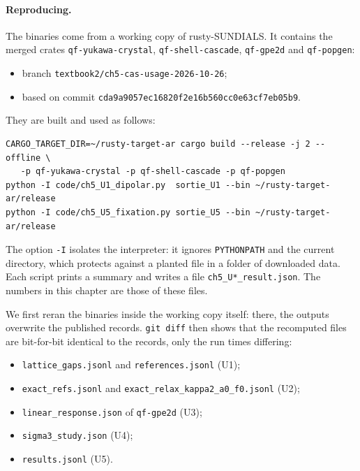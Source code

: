 \paragraph{Reproducing.} The binaries come from a working copy of rusty-SUNDIALS. It contains the merged crates
\texttt{qf-yukawa-crystal}, \texttt{qf-shell-cascade}, \texttt{qf-gpe2d} and \texttt{qf-popgen}:
\begin{itemize}
\item branch \texttt{textbook2/ch5-cas-usage-2026-10-26};
\item based on commit \texttt{cda9a9057ec16820f2e16b560cc0e63cf7eb05b9}.
\end{itemize}
They are built and used as follows:
\begin{lstlisting}[language={}]
CARGO_TARGET_DIR=~/rusty-target-ar cargo build --release -j 2 --offline \
   -p qf-yukawa-crystal -p qf-shell-cascade -p qf-popgen
python -I code/ch5_U1_dipolar.py  sortie_U1 --bin ~/rusty-target-ar/release
python -I code/ch5_U5_fixation.py sortie_U5 --bin ~/rusty-target-ar/release
\end{lstlisting}
The option \texttt{-I} isolates the interpreter: it ignores \texttt{PYTHONPATH} and the current directory, which
protects against a planted file in a folder of downloaded data. Each script prints a summary and writes a file
\texttt{ch5\_U*\_result.json}. The numbers in this chapter are those of these files.

We first reran the binaries inside the working copy itself: there, the outputs overwrite the
published records. \texttt{git diff} then shows that the recomputed files are bit-for-bit identical
to the records, only the run times differing:
\begin{itemize}
\item \texttt{lattice\_gaps.jsonl} and \texttt{references.jsonl} (U1);
\item \texttt{exact\_refs.jsonl} and \texttt{exact\_relax\_kappa2\_a0\_f0.jsonl} (U2);
\item \texttt{linear\_response.json} of \texttt{qf-gpe2d} (U3);
\item \texttt{sigma3\_study.json} (U4);
\item \texttt{results.jsonl} (U5).
\end{itemize}

